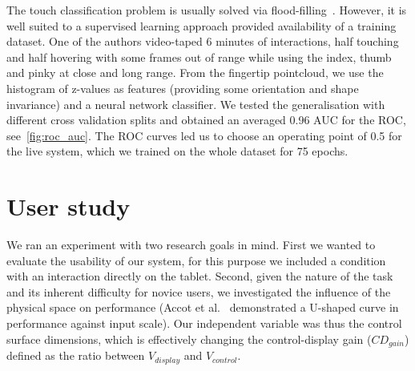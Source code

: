 \documentclass{chi-ext}
\begin{document}
The touch classification problem is usually solved via flood-filling~\cite{Harrison2011,Xiao2016,Sridhar2017}. However, it is well suited to a supervised learning approach provided availability of a training dataset. One of the authors video-taped 6 minutes of interactions, half touching and half hovering with some frames out of range while using the index, thumb and pinky at close and long range. From the fingertip pointcloud, we use the histogram of z-values as features (providing some orientation and shape invariance) and a neural network classifier. We tested the generalisation with different cross validation splits and obtained an averaged 0.96 AUC for the ROC, see~\autoref{fig:roc_auc}. The ROC curves led us to choose an operating point of 0.5 for the live system, which we trained on the whole dataset for 75 epochs.




\section{User study}
We ran an experiment with two research goals in mind. First we wanted to evaluate the usability of our system, for this purpose we included a condition with an interaction directly on the tablet. Second, given the nature of the task and its inherent difficulty for novice users, we investigated the influence of the physical space on performance (Accot et al.~\cite{Accot2001} demonstrated a U-shaped curve in performance against input scale). Our independent variable was thus the control surface dimensions, which is effectively changing the control-display gain ($CD_{gain}$) defined as the ratio between $V_{display}$ and $V_{control}$.
\end{document}
